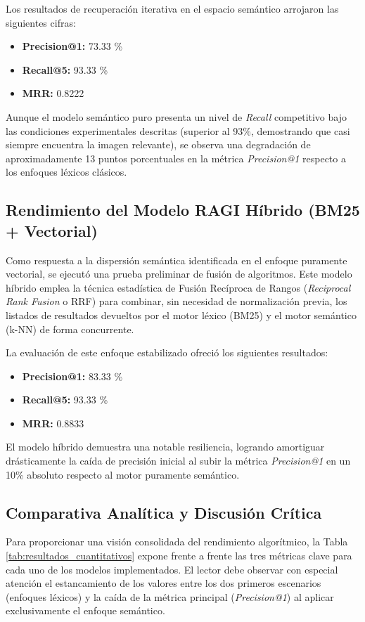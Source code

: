 \documentclass[a4paper]{report}
\begin{document}
Los resultados de recuperación iterativa en el espacio semántico arrojaron las siguientes cifras:
\begin{itemize}
    \item \textbf{Precision@1:} 73.33 \%
    \item \textbf{Recall@5:} 93.33 \%
    \item \textbf{MRR:} 0.8222
\end{itemize}

Aunque el modelo semántico puro presenta un nivel de \textit{Recall} competitivo bajo las condiciones experimentales descritas (superior al 93\%, demostrando que casi siempre encuentra la imagen relevante), se observa una degradación de aproximadamente 13 puntos porcentuales en la métrica \textit{Precision@1} respecto a los enfoques léxicos clásicos.

\subsection{Rendimiento del Modelo RAGI Híbrido (BM25 + Vectorial)}
Como respuesta a la dispersión semántica identificada en el enfoque puramente vectorial, se ejecutó una prueba preliminar de fusión de algoritmos. Este modelo híbrido emplea la técnica estadística de Fusión Recíproca de Rangos (\textit{Reciprocal Rank Fusion} o RRF) para combinar, sin necesidad de normalización previa, los listados de resultados devueltos por el motor léxico (BM25) y el motor semántico (k-NN) de forma concurrente.

La evaluación de este enfoque estabilizado ofreció los siguientes resultados:
\begin{itemize}
    \item \textbf{Precision@1:} 83.33 \%
    \item \textbf{Recall@5:} 93.33 \%
    \item \textbf{MRR:} 0.8833
\end{itemize}

El modelo híbrido demuestra una notable resiliencia, logrando amortiguar drásticamente la caída de precisión inicial al subir la métrica \textit{Precision@1} en un 10\% absoluto respecto al motor puramente semántico.

\subsection{Comparativa Analítica y Discusión Crítica}

Para proporcionar una visión consolidada del rendimiento algorítmico, la Tabla \ref{tab:resultados_cuantitativos} expone frente a frente las tres métricas clave para cada uno de los modelos implementados. El lector debe observar con especial atención el estancamiento de los valores entre los dos primeros escenarios (enfoques léxicos) y la caída de la métrica principal (\textit{Precision@1}) al aplicar exclusivamente el enfoque semántico.
\end{document}
